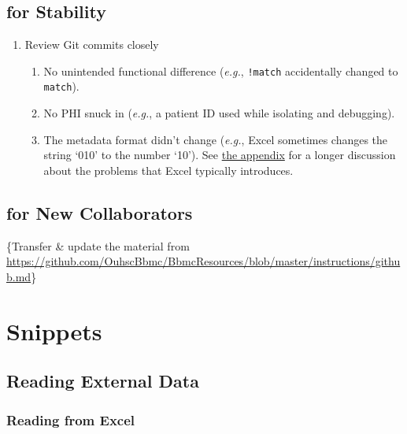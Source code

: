 \documentclass[
]{book}
\providecommand{\tightlist}{%
  \setlength{\itemsep}{0pt}\setlength{\parskip}{0pt}}
\begin{document}
\hypertarget{git-stability}{%
\section{for Stability}\label{git-stability}}

\begin{enumerate}
\def\labelenumi{\arabic{enumi}.}
\item
  Review Git commits closely

  \begin{enumerate}
  \def\labelenumii{\arabic{enumii}.}
  \tightlist
  \item
    No unintended functional difference (\emph{e.g.}, \texttt{!match} accidentally changed to \texttt{match}).
  \item
    No PHI snuck in (\emph{e.g.}, a patient ID used while isolating and debugging).
  \item
    The metadata format didn't change (\emph{e.g.}, Excel sometimes changes the string `010' to the number `10'). See \protect\hyperlink{snippets-correspondence-excel}{the appendix} for a longer discussion about the problems that Excel typically introduces.
  \end{enumerate}
\end{enumerate}

\hypertarget{git-collaborators}{%
\section{for New Collaborators}\label{git-collaborators}}

\{Transfer \& update the material from \url{https://github.com/OuhscBbmc/BbmcResources/blob/master/instructions/github.md}\}

\hypertarget{snippets}{%
\chapter{Snippets}\label{snippets}}

\hypertarget{snippets-reading}{%
\section{Reading External Data}\label{snippets-reading}}

\hypertarget{snippets-reading-excel}{%
\subsection{Reading from Excel}\label{snippets-reading-excel}}
\end{document}
